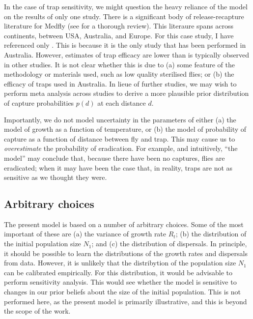 \documentclass[
  oneside]{book}
\begin{document}
In the case of trap sensitivity, we might question the heavy reliance of the model on the results of only one study. There is a significant body of release-recapture literature for Medfly (see \citet{andress2013} for a thorough review). This literaure spans across continents, between USA, Australia, and Europe. For this case study, I have referenced only \citet{ms2007}. This is because it is the only study that has been performed in Australia. However, estimates of trap efficacy are lower than is typically observed in other studies. It is not clear whether this is due to (a) some feature of the methodology or materials used, such as low quality sterilised flies; or (b) the efficacy of traps used in Australia. In lieue of further studies, we may wish to perform meta analysis across studies to derive a more plausible prior distribution of capture probabilities \(p(d)\) at each distance \(d\).

Importantly, we do not model uncertainty in the parameters of either (a) the model of growth as a function of temperature, or (b) the model of probability of capture as a function of distance between fly and trap. This may cause us to \emph{overestimate} the probability of eradication. For example, and intuitively, ``the model'' may conclude that, because there have been no captures, flies are eradicated; when it may have been the case that, in reality, traps are not as sensitive as we thought they were.

\hypertarget{arbitrary-choices}{%
\subsection{Arbitrary choices}\label{arbitrary-choices}}

The present model is based on a number of arbitrary choices. Some of the most important of these are (a) the variance of growth rate \(R_t\); (b) the distribution of the initial population size \(N_1\); and (c) the distribution of dispersals. In principle, it should be possible to learn the distributions of the growth rates and dispersals from data. However, it is unlikely that the distribytion of the population size \(N_1\) can be calibrated empirically. For this distribution, it would be advisable to perform sensitivity analysis. This would see whether the model is sensitive to changes in our prior beliefs about the size of the initial population. This is not performed here, as the present model is primarily illustrative, and this is beyond the scope of the work.
\end{document}
